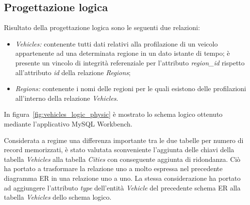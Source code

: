 \subsection{Progettazione logica}

Risultato della progettazione logica sono le seguenti due relazioni:
\begin{itemize}
\item \textit{Vehicles:} contenente tutti dati relativi alla profilazione di un veicolo
appartenente ad una determinata regione in un dato istante di tempo; è presente un
vincolo di integrità referenziale per l'attributo \textit{region\_id} rispetto
all'attributo \textit{id} della relazione \textit{Regions};
\item \textit{Regions:} contenente i nomi delle regioni per le quali esistono delle
profilazioni all'interno della relazione \textit{Vehicles}.
\end{itemize}
In figura~\ref{fig:vehicles_logic_physic} è mostrato lo schema logico ottenuto mediante
l'applicativo MySQL Workbench.

Considerata a regime una differenza importante tra le due tabelle per numero di record
memorizzati, è stato valutata sconveniente l'aggiunta delle chiavi della tabella
\textit{Vehicles} alla tabella \textit{Cities} con conseguente aggiunta di ridondanza.
Ciò ha portato a trasformare la relazione uno a molto espressa nel precedente diagramma
ER in una relazione uno a uno. La stessa considerazione ha portato ad aggiungere
l'attributo \textit{type} dell'entità \textit{Vehicle} del precedente schema ER alla
tabella \textit{Vehicles} dello schema logico.

